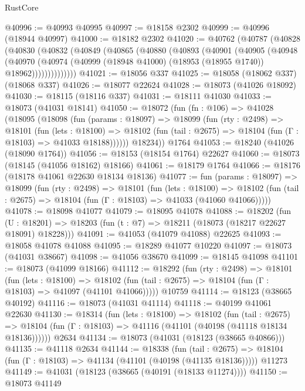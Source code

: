 \begin{lexlean}{RustCore}
\begin{coremodule}
@40996 := @40993 @40995
@40997 := @18158 @2302
@40999 := @40996 (@18944 @40997)
@41000 := @18182 @2302
@41020 := @40762
    (@40787
      (@40828
        (@40830
          (@40832
            (@40849
              (@40865
                (@40880
                  (@40893
                    (@40901
                      (@40905
                        (@40948
                          (@40970
                            (@40974
                              (@40999 (@18948 @41000) (@18953 (@18955 @1740)) @18962))))))))))))))
@41021 := @18056 @337
@41025 := @18058 (@18062 @337) (@18068 @337)
@41026 := @18077 @22624
@41028 := @18073 (@41026 @18092)
@41030 := @18115 (@18116 @337)
@41031 := @18111 @41030
@41033 := @18073 (@41031 @18141)
@41050 := @18072
    (fun (fn : @106) =>
    @41028
      (@18095
        (@18098
          (fun (params : @18097) =>
          @18099
            (fun (rty : @2498) =>
            @18101
              (fun (lets : @18100) =>
              @18102 (fun (tail : @2675) => @18104 (fun (Γ : @18103) => @41033 @18188))))))
        @18234))
    @1764
@41053 := @18240 (@41026 (@18090 @1764))
@41056 := @18153 (@18154 @1764) @22627
@41060 := @18073 (@18145 (@41056 @18162) @18166)
@41061 := @18179 @1764
@41066 := @18176 (@18178 @41061 @22630 @18134 @18136)
@41077 := fun (params : @18097) =>
  @18099
    (fun (rty : @2498) =>
    @18101
      (fun (lets : @18100) =>
      @18102 (fun (tail : @2675) => @18104 (fun (Γ : @18103) => @41033 (@41060 @41066)))))
@41078 := @18098 @41077
@41079 := @18095 @41078
@41088 := @18202
    (fun (U : @18201) => @18203 (fun (t : @7) => @18211 (@18073 (@18217 @22627 @18091) @18228)))
@41091 := @41053 (@41079 @41088) @22625
@41093 := @18058 @41078 @41088
@41095 := @18289 @41077 @10220
@41097 := @18073 (@41031 @38667)
@41098 := @41056 @38670
@41099 := @18145 @41098
@41101 := @18073 (@41099 @18166)
@41112 := @18292
    (fun (rty : @2498) =>
    @18101
      (fun (lets : @18100) =>
      @18102 (fun (tail : @2675) => @18104 (fun (Γ : @18103) => @41097 (@41101 @41066)))))
    @10759
@41114 := @18123 (@38665 @40192)
@41116 := @18073 (@41031 @41114)
@41118 := @40199 @41061 @22630
@41130 := @18314
    (fun (lets : @18100) =>
    @18102
      (fun (tail : @2675) =>
      @18104 (fun (Γ : @18103) => @41116 (@41101 (@40198 (@41118 @18134 @18136))))))
    @2634
@41134 := @18073 (@41031 (@18123 (@38665 @40866)))
@41135 := @41118 @2634
@41144 := @18338
    (fun (tail : @2675) => @18104 (fun (Γ : @18103) => @41134 (@41101 (@40198 (@41135 @18136)))))
    @11273
@41149 := @41031 (@18123 (@38665 (@40191 (@18133 @11274))))
@41150 := @18073 @41149

\end{coremodule}
\end{lexlean}
